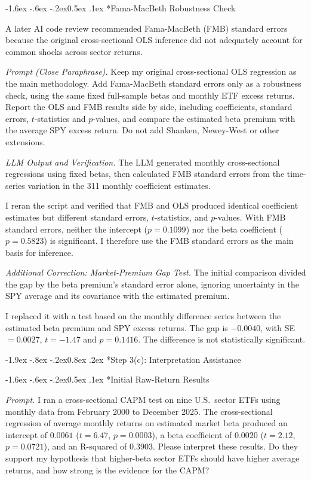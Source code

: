 \documentclass[11pt]{article}
\makeatletter
\renewcommand\subsubsection{\@startsection{subsubsection}{3}{0pt}%
  {-1.9ex \@plus -.8ex \@minus -.2ex}{0.8ex \@plus .2ex}%
  {\normalfont\bfseries\itshape\normalsize\color{psink}}}
\renewcommand\subparagraph{\@startsection{subparagraph}{5}{0pt}%
  {-1.6ex \@plus -.6ex \@minus -.2ex}{0.5ex \@plus .1ex}%
  {\normalfont\itshape\normalsize\color{psink}}}
\makeatother
\begin{document}
\subparagraph*{Fama-MacBeth Robustness Check}

A later AI code review recommended Fama-MacBeth (FMB) standard errors because
the original cross-sectional OLS inference did not adequately account for
common shocks across sector returns.

\smallskip\noindent\textit{Prompt (Close Paraphrase).} Keep my original cross-sectional OLS
regression as the main methodology. Add Fama-MacBeth standard errors only as a
robustness check, using the same fixed full-sample betas and monthly ETF excess
returns. Report the OLS and FMB results side by side, including coefficients,
standard errors, $t$-statistics and $p$-values, and compare the estimated beta
premium with the average SPY excess return. Do not add Shanken, Newey-West or
other extensions.

\smallskip\noindent\textit{LLM Output and Verification.} The LLM generated monthly
cross-sectional regressions using fixed betas, then calculated FMB standard
errors from the time-series variation in the 311 monthly coefficient estimates.

I reran the script and verified that FMB and OLS produced identical coefficient
estimates but different standard errors, $t$-statistics, and $p$-values. With
FMB standard errors, neither the intercept ($p = 0.1099$) nor the beta
coefficient ($p = 0.5823$) is significant. I therefore use the FMB standard
errors as the main basis for inference.

\smallskip\noindent\textit{Additional Correction: Market-Premium Gap Test.} The initial
comparison divided the gap by the beta premium's standard error alone, ignoring
uncertainty in the SPY average and its covariance with the estimated premium.

I replaced it with a test based on the monthly difference series between the
estimated beta premium and SPY excess returns. The gap is $-0.0040$, with
SE $= 0.0027$, $t = -1.47$ and $p = 0.1416$. The difference is not
statistically significant.

\subsubsection*{Step 3(c): Interpretation Assistance}

\subparagraph*{Initial Raw-Return Results}

\smallskip\noindent\textit{Prompt.} I ran a cross-sectional CAPM test on nine U.S.\ sector ETFs
using monthly data from February 2000 to December 2025. The cross-sectional
regression of average monthly returns on estimated market beta produced an
intercept of $0.0061$ ($t = 6.47$, $p = 0.0003$), a beta coefficient of
$0.0020$ ($t = 2.12$, $p = 0.0721$), and an R-squared of $0.3903$. Please
interpret these results. Do they support my hypothesis that higher-beta sector
ETFs should have higher average returns, and how strong is the evidence for the
CAPM?
\end{document}

